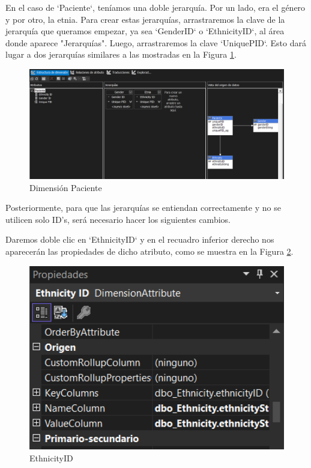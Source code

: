 \documentclass[12pt, a4paper, twoside]{article}
\begin{document}
	En el caso de `Paciente`, teníamos una doble jerarquía. Por un lado, era el género y por otro, la etnia. Para crear estas jerarquías, arrastraremos la clave de la jerarquía que queramos empezar, ya sea `GenderID` o `EthnicityID`, al área donde aparece "Jerarquías". Luego, arrastraremos la clave `UniquePID`. Esto dará lugar a dos jerarquías similares a las mostradas en la Figura \ref{fig:11}.

	\begin{figure}[H]
		\centering
		\includegraphics[width=1\textwidth]{image/dimPaciente}
		\caption{Dimensión Paciente}
		\label{fig:11}
	\end{figure}

	Posteriormente, para que las jerarquías se entiendan correctamente y no se utilicen solo ID's, será necesario hacer los siguientes cambios.

	Daremos doble clic en `EthnicityID` y en el recuadro inferior derecho nos aparecerán las propiedades de dicho atributo, como se muestra en la Figura \ref{fig:12}.

	\begin{figure}[H]
		\centering
		\includegraphics[width=1\textwidth]{image/EthnicityID}
		\caption{EthnicityID}
		\label{fig:12}
	\end{figure}
\end{document}
